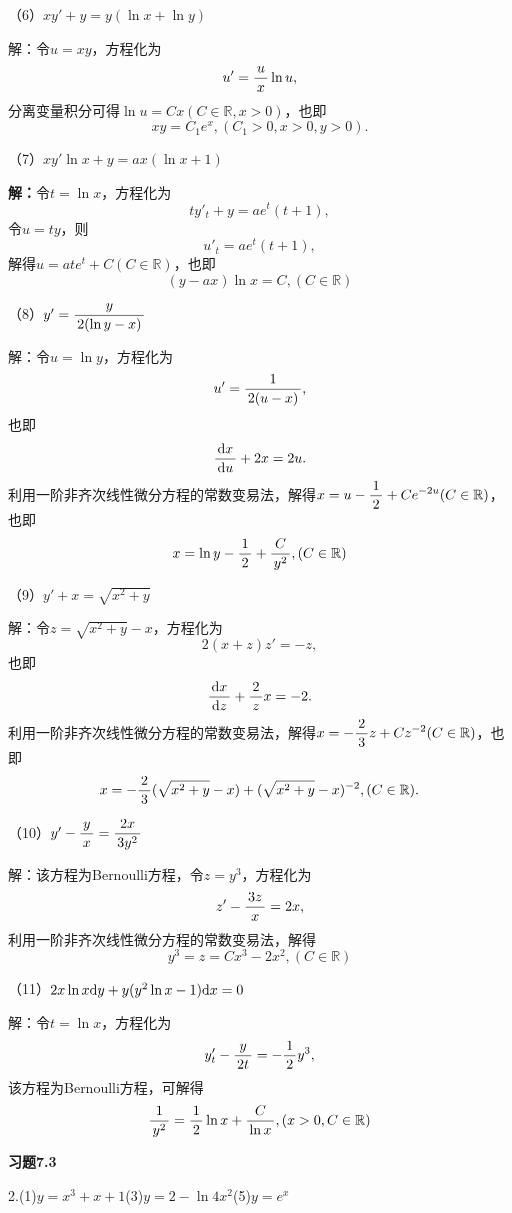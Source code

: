 （6）$xy'+y=y(\ln x+\ln y)$

解：令$u=xy$，方程化为
$$u'=\df ux\ln u,$$
分离变量积分可得$\ln u=Cx(C\in\mathbb{R},x>0)$，也即
$$xy=C_1e^x,(C_1>0,x>0,y>0).$$

% 

（7）$xy'\ln x+y=ax(\ln x+1)$

{\bf 解：}令$t=\ln x$，方程化为
$$ty'_t+y=ae^t(t+1),$$
令$u=ty$，则
$$u'_t=ae^t(t+1),$$
解得$u=ate^t+C(C\in\mathbb{R})$，也即
$$(y-ax)\ln x=C,(C\in\mathbb{R})$$

（8）$y'=\df y{2(\ln y-x)}$

解：令$u=\ln y$，方程化为
$$u'=\df1{2(u-x)},$$
也即
$$\df{\d x}{\d u}+2x=2u.$$
利用一阶非齐次线性微分方程的常数变易法，解得$x=u-\df12+Ce^{-2u}(C\in\mathbb{R})$，
也即
$$x=\ln y-\df12+\df{C}{y^2},(C\in\mathbb{R})$$

（9）$y'+x=\sqrt{x^2+y}$

解：令$z=\sqrt{x^2+y}-x$，方程化为
$$2(x+z)z'=-z,$$
也即
$$\df{\d x}{\d z}+\df2zx=-2.$$
利用一阶非齐次线性微分方程的常数变易法，解得$x=-\df23z+Cz^{-2}(C\in\mathbb{R})$，也即
$$x=-\df23(\sqrt{x^2+y}-x)+(\sqrt{x^2+y}-x)^{-2},(C\in\mathbb{R}).$$

（10）$y'-\df yx=\df{2x}{3y^2}$

解：该方程为Bernoulli方程，令$z=y^3$，方程化为
$$z'-\df{3z}x=2x,$$
利用一阶非齐次线性微分方程的常数变易法，解得
$$y^3=z=Cx^3-2x^2,(C\in\mathbb{R})$$

（11）$2x\ln x\d y+y(y^2\ln x-1)\d x=0$

解：令$t=\ln x$，方程化为
$$y'_t-\df y{2t}=-\df12y^3,$$
该方程为Bernoulli方程，可解得
$$\df1{y^2}=\df12\ln x+\df C{\ln x},(x>0,C\in\mathbb{R})$$

% 

{\bf 习题7.3}

\bigskip

2.\;(1)$y=x^3+x+1$\quad(3)$y=2-\ln4x^2$\quad(5)$y=e^x$

